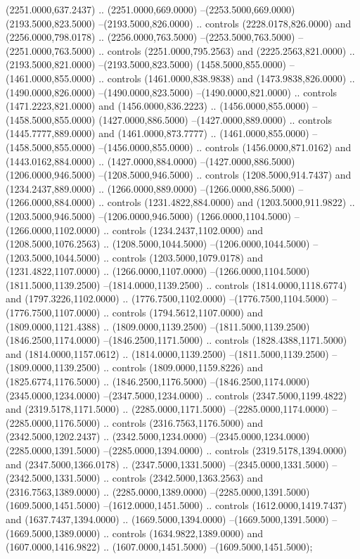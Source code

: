 (2251.0000,637.2437) .. (2251.0000,669.0000) --(2253.5000,669.0000) (2193.5000,823.5000) --(2193.5000,826.0000) .. controls (2228.0178,826.0000) and (2256.0000,798.0178) .. (2256.0000,763.5000) --(2253.5000,763.5000) --(2251.0000,763.5000) .. controls (2251.0000,795.2563) and (2225.2563,821.0000) .. (2193.5000,821.0000) --(2193.5000,823.5000) (1458.5000,855.0000) --(1461.0000,855.0000) .. controls (1461.0000,838.9838) and (1473.9838,826.0000) .. (1490.0000,826.0000) --(1490.0000,823.5000) --(1490.0000,821.0000) .. controls (1471.2223,821.0000) and (1456.0000,836.2223) .. (1456.0000,855.0000) --(1458.5000,855.0000) (1427.0000,886.5000) --(1427.0000,889.0000) .. controls (1445.7777,889.0000) and (1461.0000,873.7777) .. (1461.0000,855.0000) --(1458.5000,855.0000) --(1456.0000,855.0000) .. controls (1456.0000,871.0162) and (1443.0162,884.0000) .. (1427.0000,884.0000) --(1427.0000,886.5000) (1206.0000,946.5000) --(1208.5000,946.5000) .. controls (1208.5000,914.7437) and (1234.2437,889.0000) .. (1266.0000,889.0000) --(1266.0000,886.5000) --(1266.0000,884.0000) .. controls (1231.4822,884.0000) and (1203.5000,911.9822) .. (1203.5000,946.5000) --(1206.0000,946.5000) (1266.0000,1104.5000) --(1266.0000,1102.0000) .. controls (1234.2437,1102.0000) and (1208.5000,1076.2563) .. (1208.5000,1044.5000) --(1206.0000,1044.5000) --(1203.5000,1044.5000) .. controls (1203.5000,1079.0178) and (1231.4822,1107.0000) .. (1266.0000,1107.0000) --(1266.0000,1104.5000) (1811.5000,1139.2500) --(1814.0000,1139.2500) .. controls (1814.0000,1118.6774) and (1797.3226,1102.0000) .. (1776.7500,1102.0000) --(1776.7500,1104.5000) --(1776.7500,1107.0000) .. controls (1794.5612,1107.0000) and (1809.0000,1121.4388) .. (1809.0000,1139.2500) --(1811.5000,1139.2500) (1846.2500,1174.0000) --(1846.2500,1171.5000) .. controls (1828.4388,1171.5000) and (1814.0000,1157.0612) .. (1814.0000,1139.2500) --(1811.5000,1139.2500) --(1809.0000,1139.2500) .. controls (1809.0000,1159.8226) and (1825.6774,1176.5000) .. (1846.2500,1176.5000) --(1846.2500,1174.0000) (2345.0000,1234.0000) --(2347.5000,1234.0000) .. controls (2347.5000,1199.4822) and (2319.5178,1171.5000) .. (2285.0000,1171.5000) --(2285.0000,1174.0000) --(2285.0000,1176.5000) .. controls (2316.7563,1176.5000) and (2342.5000,1202.2437) .. (2342.5000,1234.0000) --(2345.0000,1234.0000) (2285.0000,1391.5000) --(2285.0000,1394.0000) .. controls (2319.5178,1394.0000) and (2347.5000,1366.0178) .. (2347.5000,1331.5000) --(2345.0000,1331.5000) --(2342.5000,1331.5000) .. controls (2342.5000,1363.2563) and (2316.7563,1389.0000) .. (2285.0000,1389.0000) --(2285.0000,1391.5000) (1609.5000,1451.5000) --(1612.0000,1451.5000) .. controls (1612.0000,1419.7437) and (1637.7437,1394.0000) .. (1669.5000,1394.0000) --(1669.5000,1391.5000) --(1669.5000,1389.0000) .. controls (1634.9822,1389.0000) and (1607.0000,1416.9822) .. (1607.0000,1451.5000) --(1609.5000,1451.5000);
